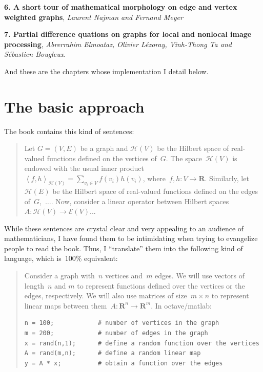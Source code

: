 {\bf 6. A short tour of mathematical morphology on edge and vertex weighted
graphs}, {\it Laurent Najman and Fernand Meyer}

{\bf 7. Partial difference quations on graphs for local and nonlocal image
processing}, {\it Abrerrahim Elmoataz, Olivier Lézoray, Vinh-Thong Ta and
Sébastien Bougleux}.

And these are the chapters whose implementation I detail below.


\section{The basic approach}

The book contains this kind of sentences:

\newcommand{\R}{\mathbf{R}}

\begin{quote}
Let $G=(V,E)$ be a graph and $\mathcal{H}(V)$ be the Hilbert space of
real-valued functions defined on the vertices of~$G$.  The
space~$\mathcal{H}(V)$ is endowed with the usual inner
product~$\left<f,h\right>_{\mathcal{H}(V)}=\sum_{v_i\in V}f(v_i)h(v_i)$,
where~$f,h:V\to\R$.
Similarly, let~$\mathcal{H}(E)$ be the Hilbert space of real-valued functions
defined on the edges of~$G$,~$\ldots$.  Now, consider a linear operator
between Hilbert spaces~$A:\mathcal{H}(V)\to\mathcal{E}(V)$...
\end{quote}

While these sentences are crystal clear and very appealing to an audience of
mathematicians, I have found them to be intimidating when trying to
evangelize people to read the book.  Thus, I ``translate'' them into the
following kind of language, which is~$100\%$ equivalent:

\begin{quote}
Consider a graph with~$n$ vertices and~$m$ edges.  We will use vectors
of length~$n$ and $m$ to represent functions defined over the vertices or
the edges, respectively.  We will also use matrices of size~$m\times n$
to represent linear maps between them~$A:\R^n\to\R^m$.  In octave/matlab:

\begin{verbatim}
n = 100;            # number of vertices in the graph
m = 200;            # number of edges in the graph
x = rand(n,1);      # define a random function over the vertices
A = rand(m,n);      # define a random linear map
y = A * x;          # obtain a function over the edges
\end{verbatim}
\end{quote}

